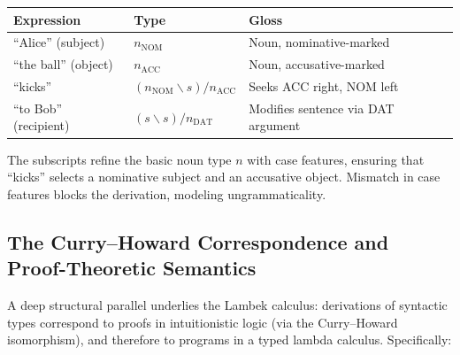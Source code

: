 \documentclass[
]{article}
\newcounter{none} %
\numberwithin{equation}{section}
\begin{document}
{\def\LTcaptype{none} %
\begin{longtable}[]{@{}
  >{\raggedright\arraybackslash}p{}
  >{\raggedright\arraybackslash}p{}
  >{\raggedright\arraybackslash}p{}@{}}
\toprule\noalign{}
\begin{minipage}[b]{\linewidth}\raggedright
Expression
\end{minipage} & \begin{minipage}[b]{\linewidth}\raggedright
Type
\end{minipage} & \begin{minipage}[b]{\linewidth}\raggedright
Gloss
\end{minipage} \\
\midrule\noalign{}
\endhead
\bottomrule\noalign{}
\endlastfoot
``Alice'' (subject) & \(n_{\text{NOM}}\) & Noun, nominative-marked \\
``the ball'' (object) & \(n_{\text{ACC}}\) & Noun, accusative-marked \\
``kicks'' & \((n_{\text{NOM}} \backslash s) / n_{\text{ACC}}\) & Seeks
ACC right, NOM left \\
``to Bob'' (recipient) & \((s \backslash s) / n_{\text{DAT}}\) &
Modifies sentence via DAT argument \\
\end{longtable}
}

The subscripts refine the basic noun type \(n\) with case features,
ensuring that ``kicks'' selects a nominative subject and an accusative
object. Mismatch in case features blocks the derivation, modeling
ungrammaticality.

\subsection{The Curry--Howard Correspondence and Proof-Theoretic
Semantics}\label{the-curryhoward-correspondence-and-proof-theoretic-semantics}

A deep structural parallel underlies the Lambek calculus: derivations of
syntactic types correspond to proofs in intuitionistic logic (via the
Curry--Howard isomorphism), and therefore to programs in a typed lambda
calculus. Specifically:
\end{document}
